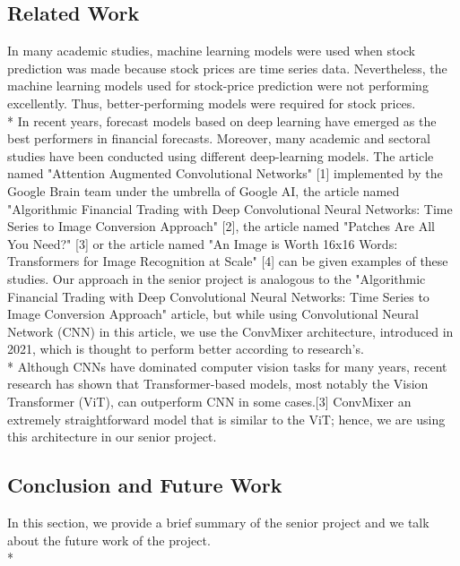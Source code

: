 \documentclass{article}
\begin{document}
\begin{center}
    \item\section{Related Work}
\end{center}
In many academic studies, machine learning models were used when stock prediction was made because stock prices are time series data. Nevertheless, the machine learning models used for stock-price prediction were not performing excellently. Thus, better-performing models were required for stock prices.\vspace{0.2cm} \\*
In recent years, forecast models based on deep learning have emerged as the best performers in financial forecasts. Moreover, many academic and sectoral studies have been conducted using different deep-learning models. The article named "Attention Augmented Convolutional Networks" [1] implemented by the Google Brain team under the umbrella of Google AI, the article named "Algorithmic Financial Trading with Deep Convolutional Neural Networks: Time Series to Image Conversion Approach" [2], the article named "Patches Are All You Need?" [3] or the article named "An Image is Worth 16x16 Words: Transformers for Image Recognition at Scale" [4] can be given examples of these studies. Our approach in the senior project is analogous to the "Algorithmic Financial Trading with Deep Convolutional Neural Networks: Time Series to Image Conversion Approach" article, but while using Convolutional Neural Network (CNN) in this article, we use the ConvMixer architecture, introduced in 2021, which is thought to perform better according to research's.\vspace{0.2cm} \\*
Although CNNs have dominated computer vision tasks for many years, recent research has shown that Transformer-based models, most notably the Vision Transformer (ViT), can outperform CNN in some cases.[3] ConvMixer an extremely straightforward model that is similar to the ViT; hence, we are using this architecture in our senior project.

\begin{center}
    \item\section{Conclusion and Future Work}
\end{center}
In this section, we provide a brief summary of the senior project and we talk about the future work of the project.\\*
\end{document}
